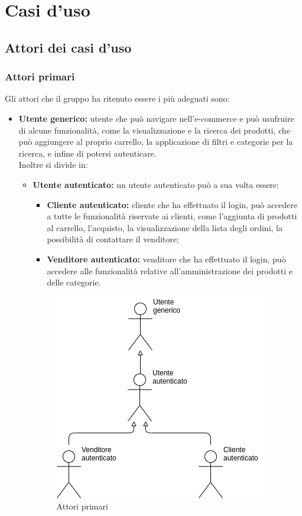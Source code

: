 \section{Casi d'uso}
\subsection{Attori dei casi d'uso}
\subsubsection{Attori primari}
Gli attori che il gruppo ha ritenuto essere i più adeguati sono:
\begin{itemize}
    \item \textbf{Utente generico:} utente che può navigare nell'e-commerce e può usufruire di alcune funzionalità, come la visualizzazione e la ricerca dei prodotti, che può aggiungere al proprio carrello, la applicazione di filtri e categorie per la ricerca, e infine di potersi autenticare.\\ Inoltre si divide in:
          \begin{itemize}
              \item \textbf{Utente autenticato:} un utente autenticato può a sua volta essere:
                    \begin{itemize}
                        \item \textbf{Cliente autenticato:} cliente che ha effettuato il login, può accedere a tutte le funzionalità riservate ai clienti, come l'aggiunta di prodotti al carrello, l'acquisto, la visualizzazione della lista degli ordini, la possibilità di contattare il venditore;
                        \item \textbf{Venditore autenticato:} venditore che ha effettuato il login, può accedere alle funzionalità relative all'amministrazione dei prodotti e delle categorie.
                    \end{itemize}
                    \begin{figure}[!ht]
                        \caption{Attori primari}
                        \vspace{5px}
                        \includegraphics[scale=0.6]{../../../Images/AnalisiRequisiti/attori}
                        \centering
                    \end{figure}
          \end{itemize}
\end{itemize}
